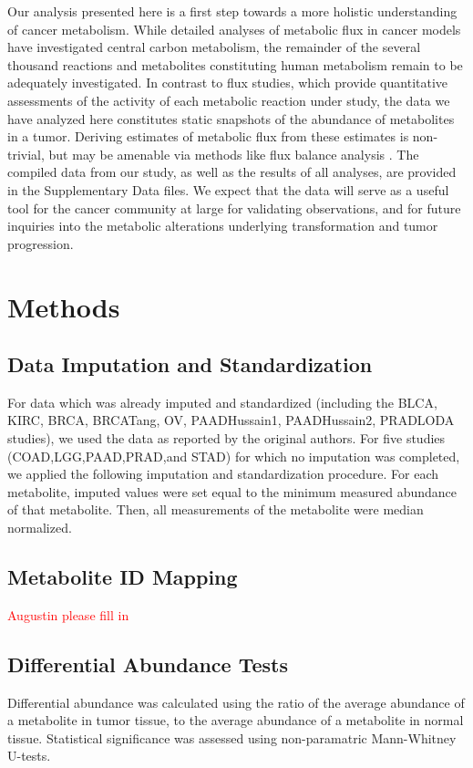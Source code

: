 \documentclass[10pt]{article}
\begin{document}
Our analysis presented here is a first step towards a more holistic understanding of cancer metabolism. While detailed analyses of metabolic flux in cancer models have investigated central carbon metabolism, the remainder of the several thousand reactions and metabolites constituting human metabolism remain to be adequately investigated. In contrast to flux studies, which provide quantitative assessments of the activity of each metabolic reaction under study, the data we have analyzed here constitutes static snapshots of the abundance of metabolites in a tumor. Deriving estimates of metabolic flux from these estimates is non-trivial, but may be amenable via methods like flux balance analysis \cite{Ortho2010,Reznik2013}. The compiled data from our study, as well as the results of all analyses, are provided in the Supplementary Data files. We expect that the data will serve as a useful tool for the cancer community at large for validating observations, and for future inquiries into the metabolic alterations underlying transformation and tumor progression.

\section{Methods}

\subsection{Data Imputation and Standardization}
For data which was already imputed and standardized (including the BLCA, KIRC, BRCA, BRCATang, OV, PAADHussain1, PAADHussain2, PRADLODA studies), we used the data as reported by the original authors. For five studies (COAD,LGG,PAAD,PRAD,and STAD) for which no imputation was completed, we applied the following imputation and standardization procedure. For each metabolite, imputed values were set equal to the minimum measured abundance of that metabolite. Then, all measurements of the metabolite were median normalized. 

\subsection{Metabolite ID Mapping}
\textcolor{red}{Augustin please fill in}

\subsection{Differential Abundance Tests}
Differential abundance was calculated using the ratio of the average abundance of a metabolite in tumor tissue, to the average abundance of a metabolite in normal tissue. Statistical significance was assessed using non-paramatric Mann-Whitney U-tests.
\end{document}

